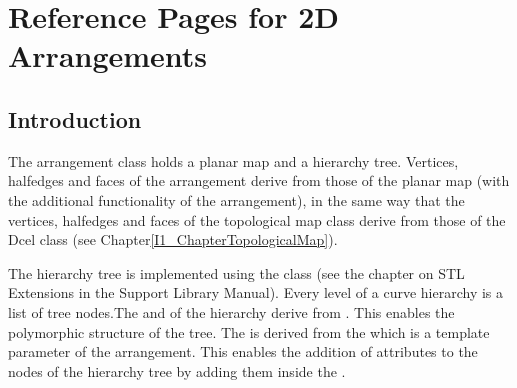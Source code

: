 


\clearpage
\section{Reference Pages for 2D Arrangements}

\subsection*{Introduction}

The arrangement class holds a planar map and a hierarchy tree.
Vertices, halfedges and faces of the arrangement derive from
those of the planar map (with the additional functionality of
the arrangement),
in the same way that the vertices, halfedges and faces of the topological map
class derive from those of the Dcel class
(see Chapter\ref{I1_ChapterTopologicalMap}).


The hierarchy tree is implemented using the 
class (see the chapter on STL Extensions in the Support Library Manual). Every level of a curve
hierarchy is a list of tree nodes.The  and 
 of 
the hierarchy derive from . This enables the
polymorphic structure of the tree. The  is
derived from the  which is a template parameter
of the arrangement. This enables the addition of attributes to the nodes
of the hierarchy tree by adding them inside the .


